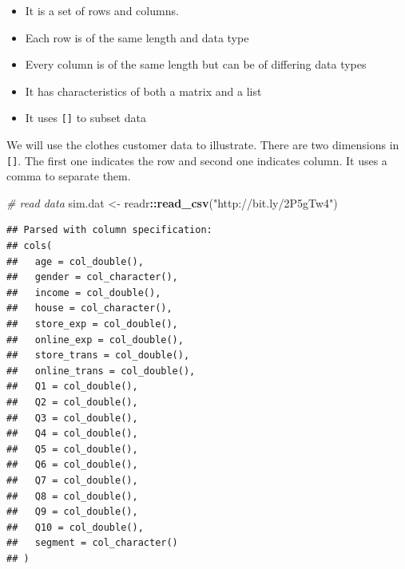 \documentclass[12pt,]{krantz}
\makeatletter
\newenvironment{Shaded}{\begin{snugshade}}{\end{snugshade}}
\newcommand{\CommentTok}[1]{\textcolor[rgb]{0.37,0.37,0.37}{\textit{#1}}}
\newcommand{\DecValTok}[1]{\textcolor[rgb]{0.06,0.06,0.06}{#1}}
\newcommand{\KeywordTok}[1]{\textcolor[rgb]{0.27,0.27,0.27}{\textbf{#1}}}
\newcommand{\NormalTok}[1]{#1}
\newcommand{\OperatorTok}[1]{\textcolor[rgb]{0.43,0.43,0.43}{\textbf{#1}}}
\newcommand{\StringTok}[1]{\textcolor[rgb]{0.5,0.5,0.5}{#1}}
\providecommand{\tightlist}{%
  \setlength{\itemsep}{0pt}\setlength{\parskip}{0pt}}
\newenvironment{kframe}{%
\medskip{}
\setlength{\fboxsep}{.8em}
 \def\at@end@of@kframe{}%
 \ifinner\ifhmode%
  \def\at@end@of@kframe{\end{minipage}}%
  \begin{minipage}{\columnwidth}%
 \fi\fi%
 \def\FrameCommand##1{\hskip\@totalleftmargin \hskip-\fboxsep
 \colorbox{shadecolor}{##1}\hskip-\fboxsep
     \hskip-\linewidth \hskip-\@totalleftmargin \hskip\columnwidth}%
 \MakeFramed {\advance\hsize-\width
   \@totalleftmargin\z@ \linewidth\hsize
   \@setminipage}}%
 {\par\unskip\endMakeFramed%
 \at@end@of@kframe}
\renewenvironment{Shaded}{\begin{kframe}}{\end{kframe}}
\makeatother
\begin{document}
\begin{itemize}
\tightlist
\item
  It is a set of rows and columns.
\item
  Each row is of the same length and data type
\item
  Every column is of the same length but can be of differing data types
\item
  It has characteristics of both a matrix and a list
\item
  It uses \texttt{{[}{]}} to subset data
\end{itemize}

We will use the clothes customer data to illustrate. There are two dimensions in \texttt{{[}{]}}. The first one indicates the row and second one indicates column. It uses a comma to separate them.

\begin{Shaded}
\begin{Highlighting}[]
\CommentTok{# read data}
\NormalTok{sim.dat <-}\StringTok{ }\NormalTok{readr}\OperatorTok{::}\KeywordTok{read_csv}\NormalTok{(}\StringTok{"http://bit.ly/2P5gTw4"}\NormalTok{)}
\end{Highlighting}
\end{Shaded}

\begin{verbatim}
## Parsed with column specification:
## cols(
##   age = col_double(),
##   gender = col_character(),
##   income = col_double(),
##   house = col_character(),
##   store_exp = col_double(),
##   online_exp = col_double(),
##   store_trans = col_double(),
##   online_trans = col_double(),
##   Q1 = col_double(),
##   Q2 = col_double(),
##   Q3 = col_double(),
##   Q4 = col_double(),
##   Q5 = col_double(),
##   Q6 = col_double(),
##   Q7 = col_double(),
##   Q8 = col_double(),
##   Q9 = col_double(),
##   Q10 = col_double(),
##   segment = col_character()
## )
\end{verbatim}

\begin{Shaded}
\end{Shaded}
\end{document}
